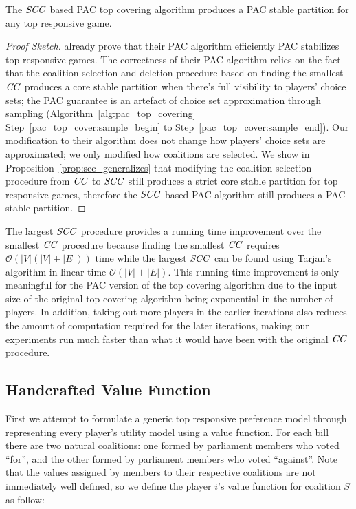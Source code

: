 \begin{theorem}
  The $\mathit{SCC}$ based PAC top covering algorithm produces a PAC stable partition
  for any top responsive game.
\end{theorem}

\begin{proof}[Proof Sketch]
 already prove that their PAC algorithm efficiently PAC
stabilizes top responsive games.
The correctness of their PAC algorithm relies on the fact that the coalition
selection and deletion procedure based on finding the smallest $\mathit{CC}$ produces
a core stable partition when there's full visibility to players' choice sets;
the PAC guarantee is an artefact of choice set approximation through sampling
(Algorithm~\ref{alg:pac_top_covering} Step~\ref{pac_top_cover:sample_begin} to
Step~\ref{pac_top_cover:sample_end}).
Our modification to their algorithm does not change how players' choice sets
are approximated; we only modified how coalitions are selected.
We show in Proposition~\ref{prop:scc_generalizes} that modifying the coalition
selection procedure from $\mathit{CC}$ to $\mathit{SCC}$ still produces a strict core stable
partition for top responsive games, therefore the $\mathit{SCC}$ based PAC algorithm
still produces a PAC stable partition.
\end{proof}

The largest $\mathit{SCC}$ procedure provides a running time improvement over the
smallest $\mathit{CC}$ procedure because finding the smallest $\mathit{CC}$ requires
$\mathcal{O}(|V|(|V| + |E|))$ time while the largest $\mathit{SCC}$ can be found using
Tarjan's algorithm in linear time $\mathcal{O}(|V| + |E|)$\cite{Tarjan72depthfirst}.
This running time improvement is only meaningful for the PAC version of the
top covering algorithm due to the input size of the original top covering
algorithm being exponential in the number of players.
In addition, taking out more players in the earlier iterations also reduces
the amount of computation required for the later iterations, making our
experiments run much faster than what it would have been with the original
$\mathit{CC}$ procedure.


\subsection{Handcrafted Value Function}
\label{subsec:handcrafted_value_function}

First we attempt to formulate a generic top responsive preference model
through representing every player's utility model using a value function.
For each bill there are two natural coalitions:
one formed by parliament members who voted ``for'',
and the other formed by parliament members who voted ``against''.
Note that the values assigned by members to their respective coalitions
are not immediately well defined,
so we define the player $i$'s value function for coalition $S$ as follow:

